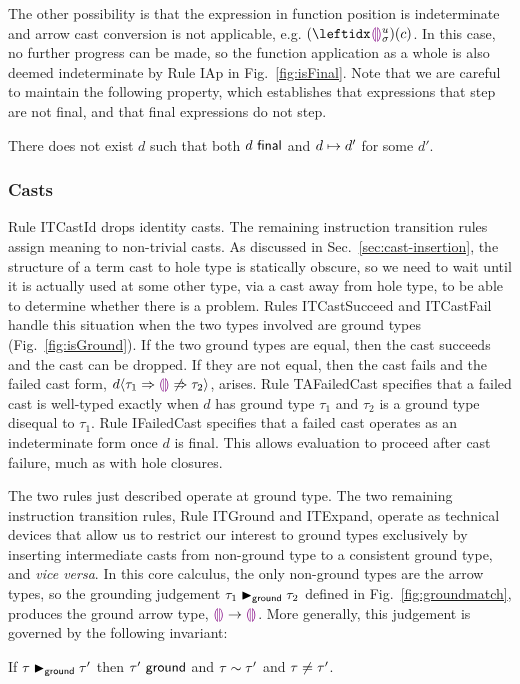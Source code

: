 The other possibility is that the expression in function position is indeterminate and arrow cast conversion is not applicable, e.g. $\hap{(\dehole{u}{\sigma}{})}{c}$. 
In this case, no further progress can be made, so the function application as a whole is also deemed indeterminate by Rule {IAp} in Fig.~\ref{fig:isFinal}. 
Note that we are careful to maintain the following property, which establishes that expressions that step are not final, and that final expressions do not step.%
%
\begin{thm}[Finality] There does not exist $d$ such that both $d~\mathsf{final}$ and $d \mapsto d'$ for some $d'$.
\end{thm}

\subsubsection{Casts}
Rule {ITCastId} drops identity casts. The remaining instruction transition rules assign meaning to non-trivial casts. 
As discussed in Sec.~\ref{sec:cast-insertion}, the structure of a term cast to hole type is statically obscure, 
so we need to wait until it is actually used at some other type, via a cast away from hole type, to be able to determine whether there is a problem. 
Rules {ITCastSucceed} and {ITCastFail} handle this situation when the two types involved are ground types (Fig.~\ref{fig:isGround}). 
If the two ground types are equal, then the cast succeeds and the cast can be dropped. 
If they are not equal, then the cast fails and the failed cast form, $d \langle{\tau_1}\Rightarrow{\textcolor{violet}{\llparenthesis}\textcolor{violet}{\rrparenthesis}}\not\Rightarrow{\tau_2}\rangle$, arises. 
Rule {TAFailedCast} specifies that a failed cast is well-typed exactly when $d$ has ground type $\tau_1$ and $\tau_2$ is a ground type disequal to $\tau_1$. 
Rule {IFailedCast} specifies that a failed cast operates as an indeterminate form once $d$ is final. 
This allows evaluation to proceed after cast failure, much as with hole closures.

The two rules just described operate at ground type. 
The two remaining instruction transition rules, Rule {ITGround} and {ITExpand}, operate as technical devices that allow us to restrict our interest to ground types exclusively by inserting intermediate casts from non-ground type to  a consistent ground type, and \emph{vice versa}. 
In this core calculus, the only non-ground types are the arrow types, so the grounding judgement $\tau_1 \blacktriangleright_{\mathsf{ground}} \tau_2$ defined in Fig.~\ref{fig:groundmatch}, produces the ground arrow type, $\textcolor{violet}{\llparenthesis}\textcolor{violet}{\rrparenthesis} \rightarrow \textcolor{violet}{\llparenthesis}\textcolor{violet}{\rrparenthesis}$. 
More generally, this judgement is governed by the following invariant:
\begin{lem}[Grounding] 
  If $\tau \blacktriangleright_{\mathsf{ground}} \tau'$
  then $\tau'~\mathsf{ground}$
  and $\tau \sim \tau'$
  and $\tau\neq\tau'$.
\end{lem}

